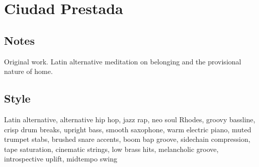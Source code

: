 \begin{lyrics}
\end{lyrics}

\section{Ciudad Prestada}

\subsection{Notes}
Original work.
Latin alternative meditation on belonging and the provisional nature of home.

\subsection{Style}
Latin alternative, alternative hip hop, jazz rap, neo soul Rhodes, groovy bassline, crisp drum breaks, upright bass, smooth saxophone, warm electric piano, muted trumpet stabs, brushed snare accents, boom bap groove, sidechain compression, tape saturation, cinematic strings, low brass hits, melancholic groove, introspective uplift, midtempo swing

